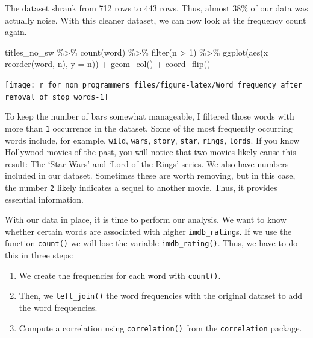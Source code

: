 \documentclass[
]{book}
\newenvironment{Shaded}{\begin{snugshade}}{\end{snugshade}}
\newcommand{\AttributeTok}[1]{\textcolor[rgb]{0.77,0.63,0.00}{#1}}
\newcommand{\DecValTok}[1]{\textcolor[rgb]{0.00,0.00,0.81}{#1}}
\newcommand{\FunctionTok}[1]{\textcolor[rgb]{0.00,0.00,0.00}{#1}}
\newcommand{\NormalTok}[1]{#1}
\newcommand{\SpecialCharTok}[1]{\textcolor[rgb]{0.00,0.00,0.00}{#1}}
\begin{document}
The dataset shrank from 712 rows to 443 rows. Thus, almost 38\% of our data was actually noise. With this cleaner dataset, we can now look at the frequency count again.

\begin{Shaded}
\begin{Highlighting}[]
\NormalTok{titles\_no\_sw }\SpecialCharTok{\%\textgreater{}\%}
  \FunctionTok{count}\NormalTok{(word) }\SpecialCharTok{\%\textgreater{}\%}
  \FunctionTok{filter}\NormalTok{(n }\SpecialCharTok{\textgreater{}} \DecValTok{1}\NormalTok{) }\SpecialCharTok{\%\textgreater{}\%}
  \FunctionTok{ggplot}\NormalTok{(}\FunctionTok{aes}\NormalTok{(}\AttributeTok{x =} \FunctionTok{reorder}\NormalTok{(word, n),}
             \AttributeTok{y =}\NormalTok{ n)) }\SpecialCharTok{+}
  \FunctionTok{geom\_col}\NormalTok{() }\SpecialCharTok{+}
  \FunctionTok{coord\_flip}\NormalTok{()}
\end{Highlighting}
\end{Shaded}

\begin{center}\texttt{[image: r\_for\_non\_programmers\_files/figure-latex/Word frequency after removal of stop words-1]} \end{center}

To keep the number of bars somewhat manageable, I filtered those words with more than \texttt{1} occurrence in the dataset. Some of the most frequently occurring words include, for example, \texttt{wild}, \texttt{wars}, \texttt{story}, \texttt{star}, \texttt{rings}, \texttt{lords}. If you know Hollywood movies of the past, you will notice that two movies likely cause this result: The `Star Wars' and `Lord of the Rings' series. We also have numbers included in our dataset. Sometimes these are worth removing, but in this case, the number \texttt{2} likely indicates a sequel to another movie. Thus, it provides essential information.

With our data in place, it is time to perform our analysis. We want to know whether certain words are associated with higher \texttt{imdb\_rating}s. If we use the function \texttt{count()} we will lose the variable \texttt{imdb\_rating()}. Thus, we have to do this in three steps:

\begin{enumerate}
\def\labelenumi{\arabic{enumi}.}
\item
  We create the frequencies for each word with \texttt{count()}.
\item
  Then, we \texttt{left\_join()} the word frequencies with the original dataset to add the word frequencies.
\item
  Compute a correlation using \texttt{correlation()} from the \texttt{correlation} package.
\end{enumerate}
\end{document}
